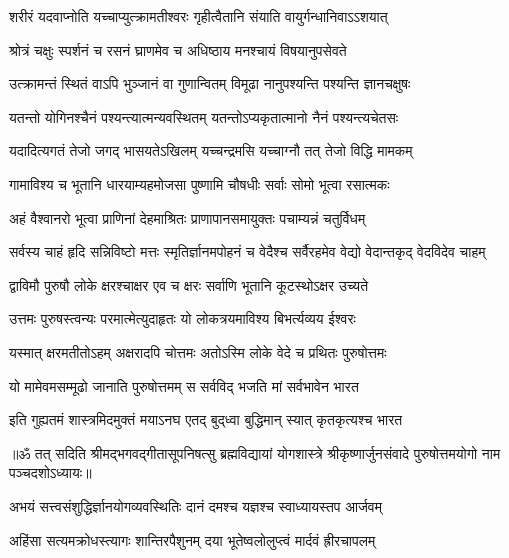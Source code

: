 \twolineshloka
{शरीरं यदवाप्नोति यच्चाप्युत्क्रामतीश्वरः}
{गृहीत्वैतानि संयाति वायुर्गन्धानिवाऽऽशयात्}%

\twolineshloka
{श्रोत्रं चक्षुः स्पर्शनं च रसनं घ्राणमेव च}
{अधिष्ठाय मनश्चायं विषयानुपसेवते}%

\twolineshloka
{उत्क्रामन्तं स्थितं वाऽपि भुञ्जानं वा गुणान्वितम्}
{विमूढा नानुपश्यन्ति पश्यन्ति ज्ञानचक्षुषः}%

\twolineshloka
{यतन्तो योगिनश्चैनं पश्यन्त्यात्मन्यवस्थितम्}
{यतन्तोऽप्यकृतात्मानो नैनं पश्यन्त्यचेतसः}%

\twolineshloka
{यदादित्यगतं तेजो जगद् भासयतेऽखिलम्}
{यच्चन्द्रमसि यच्चाग्नौ तत् तेजो विद्धि मामकम्}%

\twolineshloka
{गामाविश्य च भूतानि धारयाम्यहमोजसा}
{पुष्णामि चौषधीः सर्वाः सोमो भूत्वा रसात्मकः}%

\twolineshloka
{अहं वैश्वानरो भूत्वा प्राणिनां देहमाश्रितः}
{प्राणापानसमायुक्तः पचाम्यन्नं चतुर्विधम्}%

\fourlineindentedshloka
{सर्वस्य चाहं हृदि सन्निविष्टो}
{मत्तः स्मृतिर्ज्ञानमपोहनं च}
{वेदैश्च सर्वैरहमेव वेद्यो}
{वेदान्तकृद् वेदविदेव चाहम्}%

\twolineshloka
{द्वाविमौ पुरुषौ लोके क्षरश्चाक्षर एव च}
{क्षरः सर्वाणि भूतानि कूटस्थोऽक्षर उच्यते}%

\twolineshloka
{उत्तमः पुरुषस्त्वन्यः परमात्मेत्युदाहृतः}
{यो लोकत्रयमाविश्य बिभर्त्यव्यय ईश्वरः}%

\twolineshloka
{यस्मात् क्षरमतीतोऽहम् अक्षरादपि चोत्तमः}
{अतोऽस्मि लोके वेदे च प्रथितः पुरुषोत्तमः}%

\twolineshloka
{यो मामेवमसम्मूढो जानाति पुरुषोत्तमम्}
{स सर्वविद् भजति मां सर्वभावेन भारत}%

\twolineshloka
{इति गुह्यतमं शास्त्रमिदमुक्तं मयाऽनघ}
{एतद् बुद्‌ध्वा बुद्धिमान् स्यात् कृतकृत्यश्च भारत}%

{॥ॐ तत् सदिति श्रीमद्भगवद्गीतासूपनिषत्सु ब्रह्मविद्यायां योगशास्त्रे श्रीकृष्णार्जुनसंवादे पुरुषोत्तमयोगो नाम पञ्चदशोऽध्यायः॥}



\twolineshloka
{अभयं सत्त्वसंशुद्धिर्ज्ञानयोगव्यवस्थितिः}
{दानं दमश्च यज्ञश्च स्वाध्यायस्तप आर्जवम्}%

\twolineshloka
{अहिंसा सत्यमक्रोधस्त्यागः शान्तिरपैशुनम्}
{दया भूतेष्वलोलुप्त्वं मार्दवं ह्रीरचापलम्}%

